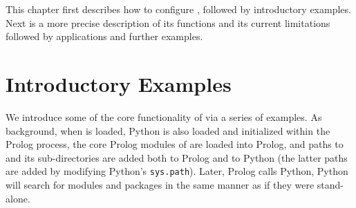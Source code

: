 This chapter first describes how to configure \janusplg , followed by
introductory examples.  Next is a more precise description of its
functions and its current limitations followed by applications and
further examples.



\section{Introductory Examples}

We introduce some of the core functionality of \janusplg{} via a
series of examples.  As background, when \janus{} is loaded, Python is
also loaded and initialized within the Prolog process, the core Prolog
modules of \janus{} are loaded into Prolog, and paths to \janus{} and its
sub-directories are added both to Prolog and to Python (the latter
paths are added by modifying Python's {\tt sys.path}). Later, Prolog
calls Python, Python will search for modules and packages in the same
manner as if they were stand-alone.

